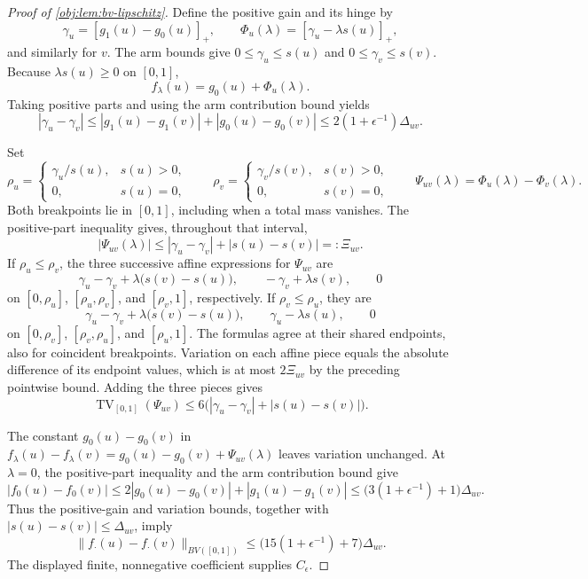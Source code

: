 \begin{proof}[Proof of \cref{obj:lem:bv-lipschitz}]
Define the positive gain and its hinge by
\[
\gamma_u=[g_1(u)-g_0(u)]_+,\qquad
\Phi_u(\lambda)=[\gamma_u-\lambda s(u)]_+,
\]
and similarly for \(v\). The arm bounds give
\(0\leq\gamma_u\leq s(u)\) and \(0\leq\gamma_v\leq s(v)\).
Because \(\lambda s(u)\geq0\) on \([0,1]\),
\[
f_\lambda(u)=g_0(u)+\Phi_u(\lambda).
\]
Taking positive parts and using the arm contribution bound yields
\[
|\gamma_u-\gamma_v|
\leq |g_1(u)-g_1(v)|+|g_0(u)-g_0(v)|
\leq2(1+\epsilon^{-1})\Delta_{uv}.
\]

Set
\[
\rho_u=
\begin{cases}\gamma_u/s(u),&s(u)>0,\\0,&s(u)=0,\end{cases}
\qquad
\rho_v=
\begin{cases}\gamma_v/s(v),&s(v)>0,\\0,&s(v)=0,\end{cases}
\qquad
\Psi_{uv}(\lambda)=\Phi_u(\lambda)-\Phi_v(\lambda).
\]
Both breakpoints lie in \([0,1]\), including when a total mass vanishes. The positive-part inequality gives, throughout that interval,
\[
|\Psi_{uv}(\lambda)|
\leq |\gamma_u-\gamma_v|+|s(u)-s(v)|
=:\Xi_{uv}.
\]
If \(\rho_u\leq\rho_v\), the three successive affine expressions for
\(\Psi_{uv}\) are
\[
\gamma_u-\gamma_v+\lambda\bigl(s(v)-s(u)\bigr),\qquad
-\gamma_v+\lambda s(v),\qquad 0
\]
on \([0,\rho_u]\), \([\rho_u,\rho_v]\), and \([\rho_v,1]\), respectively.
If \(\rho_v\leq\rho_u\), they are
\[
\gamma_u-\gamma_v+\lambda\bigl(s(v)-s(u)\bigr),\qquad
\gamma_u-\lambda s(u),\qquad 0
\]
on \([0,\rho_v]\), \([\rho_v,\rho_u]\), and \([\rho_u,1]\).
The formulas agree at their shared endpoints, also for coincident breakpoints. Variation on each affine piece equals the absolute difference of its endpoint values, which is at most \(2\Xi_{uv}\) by the preceding pointwise bound. Adding the three pieces gives
\[
\operatorname{TV}_{[0,1]}(\Psi_{uv})
\leq6\bigl(|\gamma_u-\gamma_v|+|s(u)-s(v)|\bigr).
\]

The constant \(g_0(u)-g_0(v)\) in
\(f_\lambda(u)-f_\lambda(v)=g_0(u)-g_0(v)+\Psi_{uv}(\lambda)\)
leaves variation unchanged. At \(\lambda=0\), the positive-part inequality and the arm contribution bound give
\[
|f_0(u)-f_0(v)|
\leq 2|g_0(u)-g_0(v)|+|g_1(u)-g_1(v)|
\leq\bigl(3(1+\epsilon^{-1})+1\bigr)\Delta_{uv}.
\]
Thus the positive-gain and variation bounds, together with \(|s(u)-s(v)|\leq\Delta_{uv}\), imply
\[
\|f_{\cdot}(u)-f_{\cdot}(v)\|_{BV([0,1])}
\leq\bigl(15(1+\epsilon^{-1})+7\bigr)\Delta_{uv}.
\]
The displayed finite, nonnegative coefficient supplies \(C_\epsilon\).
\end{proof}
